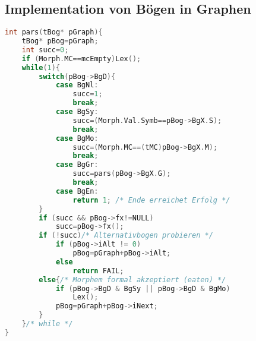 \subsection{Implementation von Bögen in Graphen}
\begin{lstlisting}[language=C]
int pars(tBog* pGraph){
	tBog* pBog=pGraph;
	int succ=0;
	if (Morph.MC==mcEmpty)Lex();
	while(1){
		switch(pBog->BgD){
			case BgNl:
				succ=1;
				break;
			case BgSy:
				succ=(Morph.Val.Symb==pBog->BgX.S);
				break;
			case BgMo:
				succ=(Morph.MC==(tMC)pBog->BgX.M);
				break;
			case BgGr:
				succ=pars(pBog->BgX.G);
				break;
			case BgEn:
				return 1; /* Ende erreichet Erfolg */
		}
		if (succ && pBog->fx!=NULL)
			succ=pBog->fx();
		if (!succ)/* Alternativbogen probieren */
			if (pBog->iAlt != 0)
				pBog=pGraph+pBog->iAlt;
			else
				return FAIL;
		else{/* Morphem formal akzeptiert (eaten) */
			if (pBog->BgD & BgSy || pBog->BgD & BgMo)
				Lex();
			pBog=pGraph+pBog->iNext;
		}
	}/* while */
}
\end{lstlisting}
